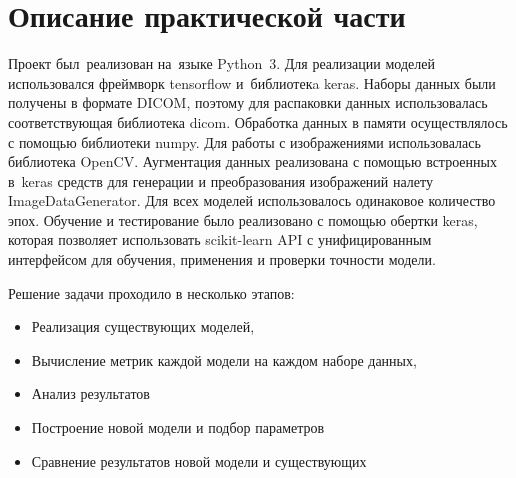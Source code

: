 \section{Описание практической части}

Проект был~реализован на~языке Python~3. Для реализации моделей использовался фреймворк tensorflow и~библиотекa keras. Наборы данных были получены в формате DICOM, поэтому для распаковки данных использовалась соответствующая библиотека dicom. Обработка данных в памяти осуществлялось с помощью библиотеки numpy. Для работы с изображениями использовалась библиотека OpenCV. Аугментация данных реализована с помощью встроенных в~keras средств для генерации и преобразования изображений налету ImageDataGenerator. Для всех моделей использовалось одинаковое количество эпох. Обучение и тестирование было реализовано с помощью обертки keras, которая позволяет использовать scikit-learn API с унифицированным интерфейсом для обучения, применения и проверки точности модели.

Решение задачи проходило в несколько этапов:

\begin{itemize}
  \item Реализация существующих моделей,
  \item Вычисление метрик каждой модели на каждом наборе данных,
  \item Анализ результатов
  \item Построение новой модели и подбор параметров
  \item Сравнение результатов новой модели и существующих
\end{itemize}

